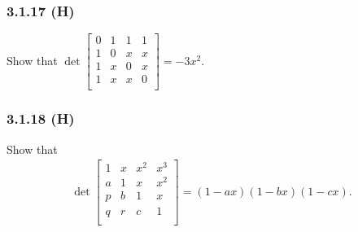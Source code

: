 \documentclass[pdf,9pt,t]{beamer}
\date{\S Review session for test II}
\begin{document}








\begin{frame}[fragile]
    \frametitle{3.1.17 (H)}
    \begin{problem}
	Show that  $\det
	\begin{bmatrix}
	    0 & 1 & 1 & 1\\
	    1 & 0 & x & x\\
	    1 & x & 0 & x\\
	    1 & x & x & 0\\
	\end{bmatrix}
	=-3x^2.$
       \end{problem}
\end{frame}

\begin{frame}[fragile]
   \frametitle{3.1.18 (H)}
   \begin{problem}
      Show that
      \begin{align*}
          \det
	    \begin{bmatrix}
		1 & x & x^2 & x^3\\
		a & 1 & x   & x^2\\
		p & b & 1   & x\\
		q & r & c   & 1\\
	    \end{bmatrix}
	    = \left(1-ax\right)\left(1-bx\right)\left(1-cx\right).
      \end{align*}
   \end{problem}
\end{frame}
\end{document}
